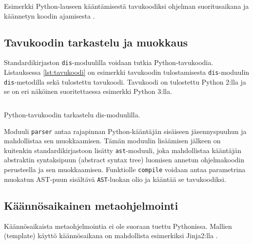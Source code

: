 \documentclass[finnish]{tktltiki2}
\theoremstyle{definition}
\theoremstyle{remark}
\begin{document}
\begin{listing}
    \inputminted[linenos]{python}{code/dynamichello.py}
    \caption{Esimerkki Python-lauseen kääntämisestä tavukoodiksi ohjelman suoritusaikana ja käännetyn koodin ajamisesta \cite{codeobjects}.}
    \label{lst:ex_compile}
\end{listing}


\subsection{Tavukoodin tarkastelu ja muokkaus}

Standardikirjaston \verb|dis|-moduulilla voidaan tutkia Python-tavukoodia. Listauksessa \ref{lst:tavukoodi} on esimerkki tavukoodin tulostamisesta \verb|dis|-moduulin \verb|dis|-metodilla sekä tulostettu tavukoodi. Tavukoodi on tulostettu Python 2:lla ja se on eri näköinen suoritettaessa esimerkki Python 3:lla.


\begin{listing}
    \inputminted[linenos]{python}{code/tavukoodi.py}
    \caption{Python-tavukoodin tarkastelu dis-moduulilla.}
    \label{lst:tavukoodi}
\end{listing}

Moduuli \verb|parser| antaa rajapinnan Python-kääntäjän sisäiseen jäsennyspuuhun ja mahdollistaa sen muokkaamisen. Tämän moduulin lisäämisen jälkeen on kuitenkin standardikirjastoon lisätty \verb|ast|-moduuli, joka mahdollistaa kääntäjän abstraktin syntaksipuun (abstract syntax tree) luomisen annetun ohjelmakoodin perusteella ja sen muokkaamisen. Funktiolle \verb|compile| voidaan antaa parametrina muokatun AST-puun sisältävä \verb|AST|-luokan olio ja kääntää se tavukoodiksi.





\subsection{Käännösaikainen metaohjelmointi}

Käännösaikaista metaohjelmointia ei ole suoraan tuettu Pythonissa. Mallien (template) käyttö käännösaikana on mahdollista esimerkiksi Jinja2:lla \cite{jinja}.
\end{document}
